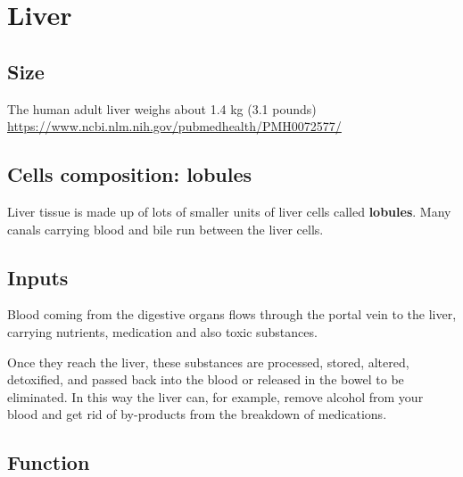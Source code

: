 \chapter{Liver}
\label{sec:liver}
\label{chap:liver}

\section{Size}
\label{sec:liver-size}

The human adult liver weighs about 1.4 kg (3.1 pounds) 
\url{https://www.ncbi.nlm.nih.gov/pubmedhealth/PMH0072577/}


\section{Cells composition: lobules}
\label{sec:lobules}

Liver tissue is made up of lots of smaller units of liver cells called
{\bf lobules}.
Many canals carrying blood and bile run between the liver cells.

\section{Inputs}

Blood coming from the digestive organs flows through the portal vein to the
liver, carrying nutrients, medication and also toxic substances.


Once they reach the liver, these substances are processed, stored, altered,
detoxified, and passed back into the blood or released in the bowel to be
eliminated. In this way the liver can, for example, remove alcohol from your
blood and get rid of by-products from the breakdown of medications.


\section{Function}
\label{sec:liver-function}

